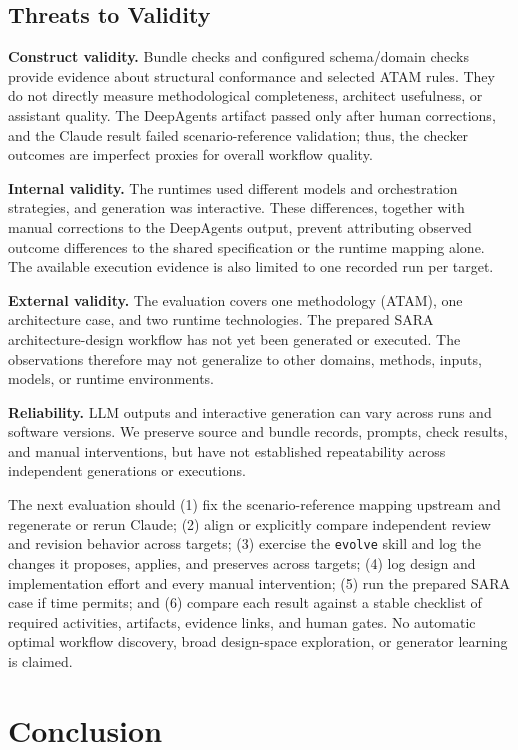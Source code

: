 \documentclass[10pt,conference]{IEEEtran}
\begin{document}
\subsection{Threats to Validity}

\textbf{Construct validity.} Bundle checks and configured schema/domain checks provide evidence about structural conformance and selected ATAM rules. They do not directly measure methodological completeness, architect usefulness, or assistant quality. The DeepAgents artifact passed only after human corrections, and the Claude result failed scenario-reference validation; thus, the checker outcomes are imperfect proxies for overall workflow quality.

\textbf{Internal validity.} The runtimes used different models and orchestration strategies, and generation was interactive. These differences, together with manual corrections to the DeepAgents output, prevent attributing observed outcome differences to the shared specification or the runtime mapping alone. The available execution evidence is also limited to one recorded run per target.

\textbf{External validity.} The evaluation covers one methodology (ATAM), one architecture case, and two runtime technologies. The prepared SARA architecture-design workflow has not yet been generated or executed. The observations therefore may not generalize to other domains, methods, inputs, models, or runtime environments.

\textbf{Reliability.} LLM outputs and interactive generation can vary across runs and software versions. We preserve source and bundle records, prompts, check results, and manual interventions, but have not established repeatability across independent generations or executions.

The next evaluation should (1) fix the scenario-reference mapping upstream and regenerate or rerun Claude; (2) align or explicitly compare independent review and revision behavior across targets; (3) exercise the \texttt{evolve} skill and log the changes it proposes, applies, and preserves across targets; (4) log design and implementation effort and every manual intervention; (5) run the prepared SARA case if time permits; and (6) compare each result against a stable checklist of required activities, artifacts, evidence links, and human gates. No automatic optimal workflow discovery, broad design-space exploration, or generator learning is claimed.

\section{Conclusion}
\end{document}
